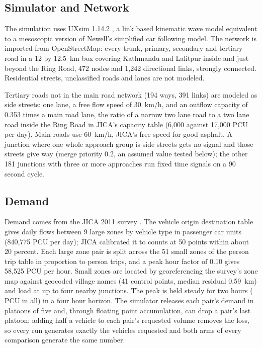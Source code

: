 \subsection{Simulator and Network}
The simulation uses UXsim 1.14.2 \citep{seo2023,seo2025}, a link based kinematic wave model
equivalent to a mesoscopic version of Newell's simplified car following model. The network is
imported from OpenStreetMap: every trunk, primary, secondary and tertiary road in a 12 by 12.5~km
box covering Kathmandu and Lalitpur inside and just beyond the Ring Road, 472 nodes and 1,242
directional links, strongly connected. Residential streets, unclassified roads and lanes are not
modeled.

Tertiary roads not in the main road network (194 ways, 391 links) are modeled as side streets:
one lane, a free flow speed of 30~km/h, and an outflow capacity of 0.353 times a main road lane,
the ratio of a narrow two lane road to a two lane road inside the Ring Road in JICA's capacity
table (6,000 against 17,000 PCU per day). Main roads use 60~km/h, JICA's free speed for good
asphalt. A junction where one whole approach group is side streets gets no signal and those
streets give way (merge priority 0.2, an assumed value tested below); the other 181 junctions with
three or more approaches run fixed time signals on a 90 second cycle.

\subsection{Demand}
Demand comes from the JICA 2011 survey \citep{jica2012}. The vehicle origin destination table
gives daily flows between 9 large zones by vehicle type in passenger car units (840,775 PCU per
day); JICA calibrated it to counts at 50 points within about 20 percent. Each large zone pair is
split across the 51 small zones of the person trip table in proportion to person trips, and a peak
hour factor of 0.10 gives 58,525 PCU per hour. Small zones are located by georeferencing the
survey's zone map against geocoded village names (41 control points, median residual 0.59~km) and
load at up to four nearby junctions. The peak is held steady for two hours (\BaseVeh{} PCU in all)
in a four hour horizon. The simulator releases each pair's demand in platoons of five and, through
floating point accumulation, can drop a pair's last platoon; adding half a vehicle to each pair's
requested volume removes the loss, so every run generates exactly the vehicles requested and both
arms of every comparison generate the same number.

